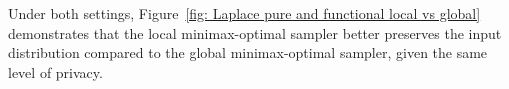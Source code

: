\documentclass[accepted]{article}
\theoremstyle{plain} %
\theoremstyle{definition}
\theoremstyle{remark}
\begin{document}
Under both settings, Figure~\ref{fig: Laplace pure and functional local vs global} demonstrates that the local minimax-optimal sampler better preserves the input distribution compared to the global minimax-optimal sampler, given the same level of privacy.








\end{document}
